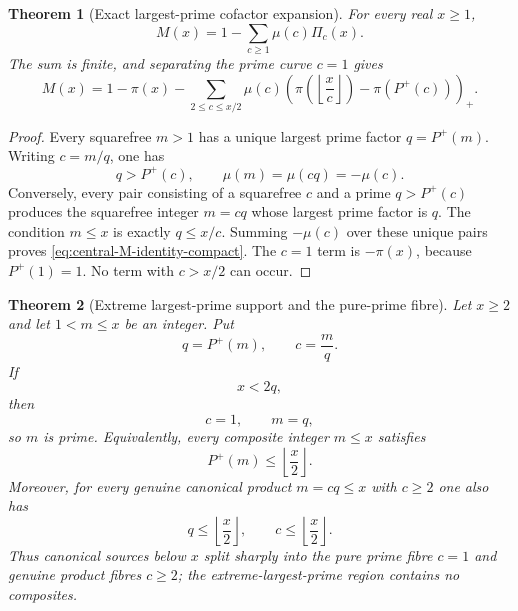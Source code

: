 \documentclass[11pt]{article}
\newtheorem{theorem}{Theorem}[section]
\theoremstyle{definition}
\newcommand{\Pplus}{P^{+}}
\newcommand{\1}{\mathbf{1}}
\begin{document}
\begin{theorem}[Exact largest-prime cofactor expansion]
\label{thm:central-M-identity}
For every real $x\ge1$,
\begin{equation}
 \boxed{
 M(x)
 =
 1-\sum_{c\ge1}\mu(c)\Pi_c(x).
 }
 \label{eq:central-M-identity-compact}
\end{equation}
The sum is finite, and separating the prime curve $c=1$ gives
\begin{equation}
 \boxed{
 M(x)
 =
 1-\pi(x)
 -\sum_{2\le c\le x/2}
 \mu(c)
 \left(
 \pi\!\left(\left\lfloor\frac{x}{c}\right\rfloor\right)
 -\pi(\Pplus(c))
 \right)_{+}.
 }
 \label{eq:central-M-identity}
\end{equation}
\end{theorem}

\begin{proof}
Every squarefree $m>1$ has a unique largest prime factor
$q=\Pplus(m)$.  Writing $c=m/q$, one has
\[
 q>\Pplus(c),
 \qquad
 \mu(m)=\mu(cq)=-\mu(c).
\]
Conversely, every pair consisting of a squarefree $c$ and a prime
$q>\Pplus(c)$ produces the squarefree integer $m=cq$ whose largest
prime factor is $q$.  The condition $m\le x$ is exactly $q\le x/c$.
Summing $-\mu(c)$ over these unique pairs proves
\cref{eq:central-M-identity-compact}.  The $c=1$ term is
$-\pi(x)$, because $\Pplus(1)=1$.  No term with $c>x/2$ can occur.
\end{proof}

\begin{theorem}[Extreme largest-prime support and the pure-prime fibre]
\label{thm:extreme-largest-prime}
Let $x\ge2$ and let $1<m\le x$ be an integer.  Put
\[
 q=\Pplus(m),\qquad c=\frac{m}{q}.
\]
If
\begin{equation}
 x<2q,
 \label{eq:extreme-q-condition}
\end{equation}
then
\begin{equation}
 \boxed{c=1,\qquad m=q,}
 \label{eq:extreme-prime-fibre}
\end{equation}
so $m$ is prime.  Equivalently, every composite integer $m\le x$ satisfies
\begin{equation}
 \boxed{\Pplus(m)\le\left\lfloor\frac{x}{2}\right\rfloor.}
 \label{eq:composite-largest-prime-half}
\end{equation}
Moreover, for every genuine canonical product $m=cq\le x$ with $c\ge2$ one also has
\begin{equation}
 \boxed{q\le\left\lfloor\frac{x}{2}\right\rfloor,\qquad
 c\le\left\lfloor\frac{x}{2}\right\rfloor.}
 \label{eq:both-canonical-factors-half}
\end{equation}
Thus canonical sources below $x$ split sharply into the pure prime fibre $c=1$ and genuine product fibres $c\ge2$; the extreme-largest-prime region contains no composites.
\end{theorem}
\end{document}
